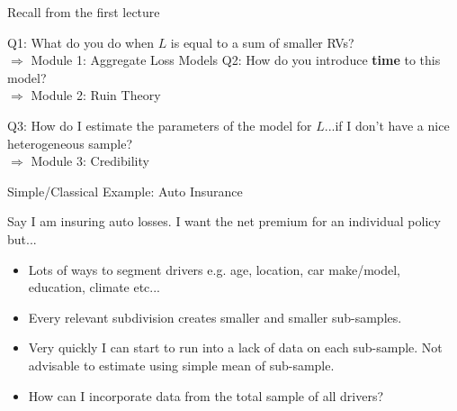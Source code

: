 \documentclass[11pt]{beamer}
\begin{document}
\begin{frame}{Recall from the first lecture}

Q1: What do you do when $L$ is equal to a sum of smaller RVs? \\
\color{red}$\Rightarrow$  Module 1: Aggregate Loss Models
\vfill
\color{black}Q2: How do you introduce \textbf{time} to this model? \\
\color{red}$\Rightarrow$  Module 2: Ruin Theory
\vfill


\color{black} Q3: How do I estimate the parameters of the model for $L$...if I don't have a nice heterogeneous sample? \\
\color{red}$\Rightarrow$  Module 3: Credibility 

\end{frame}
\begin{frame}{Simple/Classical Example: Auto Insurance}

Say I am insuring auto losses. I want the net premium for an individual policy but...

\begin{itemize}

\item Lots of ways to segment drivers e.g. age, location, car make/model, education, climate etc...

\vfill

\item Every relevant subdivision creates smaller and smaller sub-samples. 

\vfill


\item Very quickly I can start to run into a lack of data on each sub-sample. Not advisable to estimate using simple mean of sub-sample.

\vfill


\item How can I incorporate data from the total sample of all drivers?

\end{itemize}

\end{frame}
\end{document}
